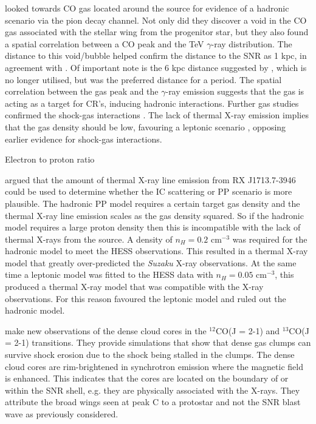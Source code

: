\documentclass[12pt,a4paper]{article}
\begin{document}
\cite{2003PASJ...55L..61F} looked towards CO gas located around the source for evidence of a hadronic scenario via the pion decay channel. Not only did they discover a void in the CO gas associated with the stellar wing from the progenitor star, but they also found a spatial correlation between a CO peak and the TeV $\gamma$-ray distribution. The distance to this void/bubble helped confirm the distance to the SNR as 1 kpc, in agreement with \cite{1996rftu.proc..267P,2005ApJ...631..947M}. Of important note is the 6 kpc distance suggested by \cite{1999ApJ...525..357S}, which is no longer utilised, but was the preferred distance for a period. The spatial correlation between the gas peak and the $\gamma$-ray emission suggests that the gas is acting as a target for CR's, inducing hadronic interactions. Further gas studies confirmed the shock-gas interactions \citep{2005ApJ...631..947M}. 
The lack of thermal X-ray emission implies that the gas density should be low, favouring a leptonic scenario \citep{2010ApJ...712..287E}, opposing earlier evidence for shock-gas interactions.


Electron to proton ratio




\cite{2010ApJ...712..287E} argued that the amount of thermal X-ray line emission from RX J1713.7-3946 could be used to determine whether the IC scattering or PP scenario is more plausible. The hadronic PP model requires a certain target gas density and the thermal X-ray line emission scales as the gas density squared. So if the hadronic model requires a large proton density then this is incompatible with the lack of thermal X-rays from the source. A density of $n_H = 0.2$ cm$^{-3}$ was required for the hadronic model to meet the HESS observations. This resulted in a thermal X-ray model that greatly over-predicted the \textit{Suzaku} X-ray observations. At the same time a leptonic model was fitted to the HESS data with $n_H = 0.05$ cm$^{-3}$, this produced a thermal X-ray model that was compatible with the X-ray observations. For this reason \cite{2010ApJ...712..287E} favoured the leptonic model and ruled out the hadronic model.

\cite{2010ApJ...724...59S} make new observations of the dense cloud cores in the $^{12}$CO(J = 2-1) and $^{13}$CO(J = 2-1) transitions. They provide simulations that show that dense gas clumps can survive shock erosion due to the shock being stalled in the clumps. The dense cloud cores are rim-brightened in synchrotron emission where the magnetic field is enhanced. This indicates that the cores are located on the boundary of or within the SNR shell, e.g. they are physically associated with the X-rays. They attribute the broad wings seen at peak C \citep{2003PASJ...55L..61F, 2005ApJ...631..947M} to a protostar and not the SNR blast wave as previously considered. 
\end{document}
